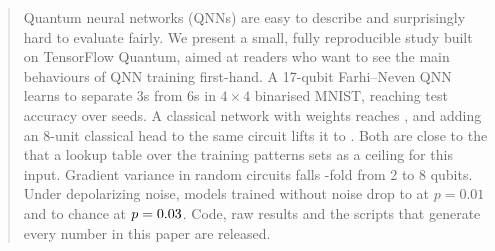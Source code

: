 \begin{abstract}
Quantum neural networks (QNNs) are easy to describe and surprisingly hard to evaluate fairly. We
present a small, fully reproducible study built on TensorFlow Quantum, aimed at readers who want to see
the main behaviours of QNN training first-hand. A 17-qubit Farhi--Neven QNN learns to separate 3s from
6s in $4\times4$ binarised MNIST, reaching \valQnnAcc{} test accuracy over \valMnistSeeds{} seeds. A
classical network with \valClassicalParams{} weights reaches \valClassicalAcc{}, and adding an 8-unit
classical head to the same circuit lifts it to \valHybridAcc{}. Both are close to the \valCeilFour{}
that a lookup table over the training patterns sets as a ceiling for this input. Gradient variance in
random circuits falls \valBpRatioEight-fold from 2 to 8 qubits. Under depolarizing noise, models
trained without noise drop to \valNoiseEvMid{} at $p=0.01$ and to chance at $p=\valNoiseMaxP$. Code,
raw results and the scripts that generate every number in this paper are released.
\end{abstract}
